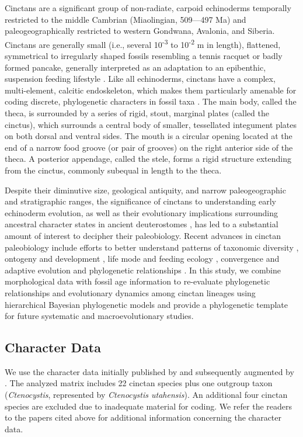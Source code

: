 \documentclass{article}
\begin{document}
Cinctans are a significant group of non-radiate, carpoid echinoderms temporally restricted to the middle Cambrian (Miaolingian, 509—497 Ma) and paleogeographically restricted to western Gondwana, Avalonia, and Siberia. Cinctans are generally small (i.e., several 10\textsuperscript{-3} to 10\textsuperscript{-2} m in length), flattened, symmetrical to irregularly shaped fossils resembling a tennis racquet or badly formed pancake, generally interpreted as an adaptation to an epibenthic, suspension feeding lifestyle \citep{Rahman2009a, RahmanEtAl2015}.  Like all echinoderms, cinctans have a complex, multi-element, calcitic endoskeleton, which makes them particularly amenable for coding discrete, phylogenetic characters in fossil taxa \citep{SmithZamora2009}. The main body, called the theca, is surrounded by a series of rigid, stout, marginal plates (called the cinctus), which surrounds a central body of smaller, tessellated integument plates on both dorsal and ventral sides. The mouth is a circular opening located at the end of a narrow food groove (or pair of grooves) on the right anterior side of the theca. A posterior appendage, called the stele, forms a rigid structure extending from the cinctus, commonly subequal in length to the theca. 

Despite their diminutive size, geological antiquity, and narrow paleogeographic and stratigraphic ranges, the significance of cinctans to understanding early echinoderm evolution, as well as their evolutionary implications surrounding ancestral character states in ancient deuterostomes \citep{SmithSwalla2009}, has led to a substantial amount of interest to decipher their paleobiology. Recent advances in cinctan paleobiology include efforts to better understand patterns of taxonomic diversity \citep{ZamoraAlvaro2010}, ontogeny and development \citep{Smith2005,ZamoraRahmanSmith2013}, life mode and feeding ecology \citep{Rahman2009b, RahmanEtAl2015,ZamoraRahman2015}, convergence and adaptive evolution \citep{ZamoraSmith2008} and phylogenetic relationships \citep{Freidrich1993, Sdzuy1993, SmithZamora2009, ZamoraRahmanSmith2013}. In this study, we combine morphological data with fossil age information to re-evaluate phylogenetic relationships and evolutionary dynamics among cinctan lineages using hierarchical Bayesian phylogenetic models and provide a phylogenetic template for future systematic and macroevolutionary studies.

\subsection{Character Data}
We use the character data initially published by \citep{SmithZamora2009} and subsequently augmented by \citep{ZamoraRahmanSmith2013}.  The analyzed matrix includes 22 cinctan species plus one outgroup taxon (\textit{Ctenocystis}, represented by \textit{Ctenocystis utahensis}). An additional four cinctan species are excluded due to inadequate material for coding.  We refer the readers to the papers cited above for additional information concerning the character data.
\end{document}
